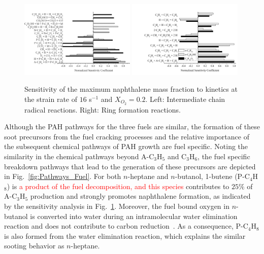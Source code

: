 \documentclass[review,3p,times]{elsarticleUS}
\begin{document}
\begin{figure}[t]
  \centering
  \scriptsize
  \includegraphics[trim=0mm 0mm 0mm 8mm, clip=true,width=0.49\textwidth]{Chain.png}
  \includegraphics[trim=0mm 0mm 0mm 8mm, clip=true,width=0.49\textwidth]{Ring.png}
  \normalsize
  \vspace{-0.2in}
  \caption{Sensitivity of the maximum naphthalene mass fraction to kinetics at the strain rate of $16$ s$^{-1}$ and $X_{O_2}=0.2$. Left: Intermediate chain radical reactions. Right: Ring formation reactions.}
  \label{fig:SA4}
\end{figure}

Although the PAH pathways for the three fuels are similar, the formation of these soot precursors from the fuel cracking processes and the relative importance of the subsequent chemical pathways of PAH growth are fuel specific. Noting the similarity in the chemical pathways beyond A-C$_3$H$_5$ and C$_3$H$_6$, the fuel specific breakdown pathways that lead to the generation of these precursors are depicted in Fig.~\ref{fig:Pathways_Fuel}. For both $n$-heptane and $n$-butanol, 1-butene (P-C$_4$H$_8$) is \textcolor{red}{a product of the fuel decomposition, and this species} contributes to $25\%$ of A-C$_3$H$_5$ production and strongly promotes naphthalene formation, as indicated by the sensitivity analysis in Fig.~\ref{fig:SA4}. Moreover, the fuel bound oxygen in $n$-butanol is converted into water during an intramolecular water elimination reaction and does not contribute to carbon reduction~\cite{mcenally05,mcenally11}.  As a consequence, P-C$_4$H$_8$ is also formed from the water elimination reaction, which explains the similar sooting behavior as $n$-heptane.
\end{document}
